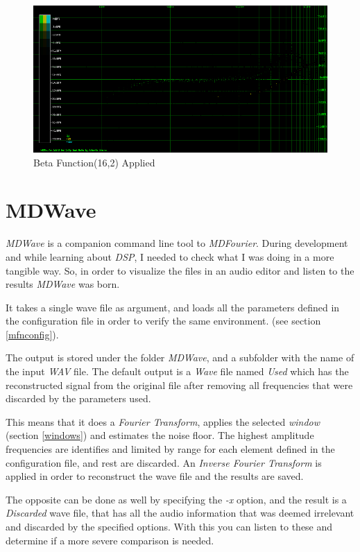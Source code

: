 \documentclass[10pt,a4paper]{report}
\begin{document}
\begin{appendices}
\begin{figure}[H]
	\centering
	\includegraphics[width=1\linewidth]{images/colorfilter/BetaFunctionPlot_5_Data.png}
	\caption[Beta Function(16,2)]{Beta Function(16,2) Applied}
	\label{fig:betafunctionplot5data}
\end{figure}

\chapter{MDWave}
\label{mdwave}

\textit{MDWave} is a companion command line tool to \textit{MDFourier}. During development and while learning about \textit{DSP}, I needed to check what I was doing in a more tangible way. So, in order to visualize the files in an audio editor and listen to the results \textit{MDWave} was born.

It takes a single wave file as argument, and loads all the parameters defined in the configuration file in order to verify the same environment. (see section \ref{mfnconfig}).

The output is stored under the folder \textit{MDWave}, and a subfolder with the name of the input \textit{WAV} file. The default output is a \textit{Wave} file named \textit{Used} which has the reconstructed signal from the original file after removing all frequencies that were discarded by the parameters used.

This means that it does a \textit{Fourier Transform}, applies the selected \textit{window} (section \ref{windows}) and estimates the noise floor. The highest amplitude frequencies are identifies and limited by range for each element defined in the configuration file, and rest are discarded. An \textit{Inverse Fourier Transform} is applied in order to reconstruct the wave file and the results are saved.

The opposite can be done as well by specifying the \textit{-x} option, and the result is a \textit{Discarded} wave file, that has all the audio information that was deemed irrelevant and discarded by the specified options. With this you can listen to these and determine if a more severe comparison is needed.


\end{appendices}
\end{document}
